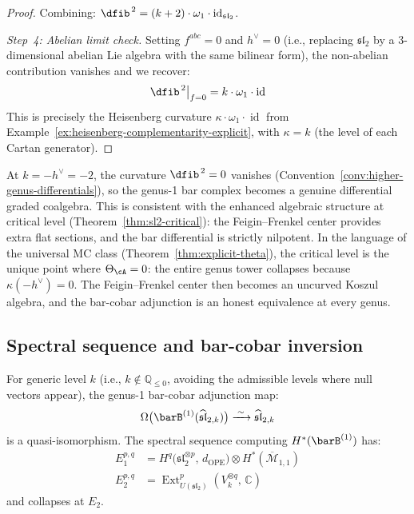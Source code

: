 \begin{proof}
Combining: $\dfib^{\,2} = (k+2) \cdot \omega_1 \cdot \operatorname{id}_{\mathfrak{sl}_2}$.

\emph{Step~4: Abelian limit check.}
Setting $f^{abc} = 0$ and $h^\vee = 0$ (i.e., replacing $\mathfrak{sl}_2$ by a $3$-dimensional abelian Lie algebra with the same bilinear form), the non-abelian contribution vanishes and we recover:
\begin{equation}
\dfib^{\,2}\big|_{f=0} = k \cdot \omega_1 \cdot \operatorname{id}
\end{equation}
This is precisely the Heisenberg curvature $\kappa \cdot \omega_1 \cdot \operatorname{id}$ from Example~\ref{ex:heisenberg-complementarity-explicit}, with $\kappa = k$ (the level of each Cartan generator).
\end{proof}

\begin{remark}
At $k = -h^\vee = -2$, the curvature $\dfib^{\,2} = 0$ vanishes (Convention~\ref{conv:higher-genus-differentials}), so the genus-1 bar complex becomes a genuine differential graded coalgebra.  This is consistent with the enhanced algebraic structure at critical level (Theorem~\ref{thm:sl2-critical}): the Feigin--Frenkel center provides extra flat sections, and the bar differential is strictly nilpotent.
In the language of the universal MC class
(Theorem~\ref{thm:explicit-theta}), the critical level is
the unique point where $\Theta_{\cA} = 0$: the entire genus
tower collapses because $\kappa(-h^\vee) = 0$.  The
Feigin--Frenkel center then becomes an uncurved Koszul algebra,
and the bar-cobar adjunction is an honest equivalence at
every genus.
\end{remark}

\subsection{Spectral sequence and bar-cobar inversion}

\begin{theorem}
\label{thm:sl2-genus1-inversion}
For generic level $k$ (i.e., $k \notin \mathbb{Q}_{\leq 0}$, avoiding the admissible levels where null vectors appear), the genus-1 bar-cobar adjunction map:
\begin{equation}
\Omega\bigl(\barB^{(1)}(\widehat{\mathfrak{sl}}_{2,k})\bigr) \xrightarrow{\;\sim\;} \widehat{\mathfrak{sl}}_{2,k}
\end{equation}
is a quasi-isomorphism.  The spectral sequence computing $H^*(\barB^{(1)})$ has:
\begin{align}
E_1^{p,q} &= H^q\bigl(\mathfrak{sl}_2^{\otimes p},\, d_{\mathrm{OPE}}\bigr) \otimes H^*(\overline{\mathcal{M}}_{1,1}) \\
E_2^{p,q} &= \operatorname{Ext}^p_{U(\mathfrak{sl}_2)}(V_k^{\otimes q},\, \mathbb{C})
\end{align}
and collapses at $E_2$.
\end{theorem}


